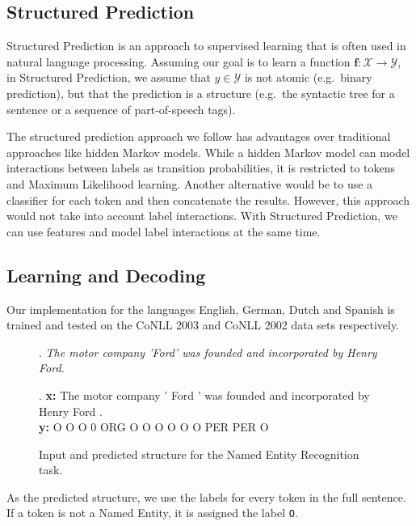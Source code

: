 \documentclass[11pt]{article}
\newcommand{\namedentity}{Named Entity}
\newcommand{\Oo}{\texttt O}
\begin{document}
\subsection{Structured Prediction}
Structured Prediction \cite{Taskar:2005:LSP:1102351.1102464} is an approach to supervised learning that is often used in natural language processing. 
Assuming our goal is to learn a function ${ \boldsymbol{f}\colon \mathcal{X}\to\mathcal{Y} }$, in Structured Prediction, we assume that $y \in \mathcal{Y}$ 
is not atomic (e.g.\ binary prediction), but that the prediction is a structure (e.g.\ the syntactic tree for a sentence or a sequence of part-of-speech tags). 

The structured prediction approach we follow has advantages over traditional approaches like hidden Markov models. While a hidden Markov model can model interactions 
between labels as transition probabilities, it is restricted to tokens and Maximum Likelihood learning. Another alternative would be to use a classifier for each 
token and then concatenate the results. However, this approach would not take into account label interactions. With Structured Prediction, we can use features and 
model label interactions at the same time.

\subsection{Learning and Decoding}

Our implementation for the languages English, German, Dutch and Spanish is trained and tested on the CoNLL 2003 and CoNLL 2002 data sets respectively. 


\begin{figure}[ht]

\ex. \emph{The motor company 'Ford' was founded and incorporated  by Henry Ford.} \label{PredEx1a}
 
\exg. \textbf{x:} The motor company ' Ford ' was founded and incorporated by Henry Ford .\\
      \textbf{y:}  O   O      O     0 ORG  O  O     O     O       O        O PER   PER  O  \label{PredEx1b} \\
\caption{Input and predicted structure for the Named Entity Recognition task.}

\end{figure}


As the predicted structure, we use the labels for every token in the full sentence. If a token is not a \namedentity, it is assigned the label \Oo.
\end{document}
